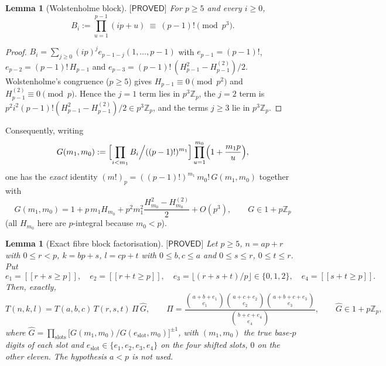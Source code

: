 \documentclass[11pt,reqno]{amsart}
\theoremstyle{plain}
\newtheorem{lemma}[theorem]{Lemma}
\theoremstyle{definition}
\theoremstyle{remark}
\numberwithin{equation}{section}
\newcommand{\ZZ}{\mathbb{Z}}
\newcommand{\Zp}{\ZZ_p}
\newcommand{\ii}[1]{[\![#1]\!]}
\newcommand{\PROVED}{\textsf{[PROVED]}}
\begin{document}
\begin{lemma}[Wolstenholme block]\label{lem:W}
$\PROVED$ For $p\ge5$ and every $i\ge0$,
\[
B_i:=\prod_{u=1}^{p-1}(ip+u)\ \equiv\ (p-1)!\pmod{p^3}.
\]
\end{lemma}

\begin{proof}
$B_i=\sum_{j\ge0}(ip)^je_{p-1-j}(1,\dots,p-1)$ with $e_{p-1}=(p-1)!$,
$e_{p-2}=(p-1)!\,H_{p-1}$ and $e_{p-3}=(p-1)!\,(H_{p-1}^2-H^{(2)}_{p-1})/2$. Wolstenholme's
congruence ($p\ge5$) gives $H_{p-1}\equiv0\pmod{p^2}$ and $H^{(2)}_{p-1}\equiv0\pmod p$. Hence
the $j=1$ term lies in $p^3\Zp$, the $j=2$ term is
$p^2i^2(p-1)!(H_{p-1}^2-H^{(2)}_{p-1})/2\in p^3\Zp$, and the terms $j\ge3$ lie in $p^3\Zp$.
\end{proof}

Consequently, writing
\begin{equation}\label{eq:G}
G(m_1,m_0):=\Bigl[\prod_{i<m_1}B_i\Big/((p-1)!)^{m_1}\Bigr]\prod_{u=1}^{m_0}\Bigl(1+\frac{m_1p}{u}\Bigr),
\end{equation}
one has the \emph{exact} identity $(m!)_p=((p-1)!)^{m_1}\,m_0!\,G(m_1,m_0)$ together with
\[
G(m_1,m_0)=1+p\,m_1H_{m_0}+p^2m_1^2\frac{H_{m_0}^2-H^{(2)}_{m_0}}{2}+O(p^3),
\qquad G\in1+p\Zp
\]
(all $H_{m_0}$ here are $p$-integral because $m_0<p$).

\begin{lemma}[Exact fibre block factorisation]\label{lem:B}
$\PROVED$ Let $p\ge5$, $n=ap+r$ with $0\le r<p$, $k=bp+s$, $l=cp+t$ with $0\le b,c\le a$ and
$0\le s\le r$, $0\le t\le r$. Put
\[
e_1=\ii{r+s\ge p},\quad e_2=\ii{r+t\ge p},\quad e_3=\lfloor(r+s+t)/p\rfloor\in\{0,1,2\},\quad
e_4=\ii{s+t\ge p}.
\]
Then, \emph{exactly},
\begin{equation}\label{eq:LemB}
T(n,k,l)=T(a,b,c)\,T(r,s,t)\,\Pi\,\hat G,\qquad
\Pi=\frac{\binom{a+b+e_1}{e_1}\binom{a+c+e_2}{e_2}\binom{a+b+c+e_3}{e_3}}{\binom{b+c+e_4}{e_4}},
\qquad \hat G\in1+p\Zp,
\end{equation}
where $\hat G=\prod_{\mathrm{slots}}\bigl[G(m_1,m_0)/G(e_{\mathrm{slot}},m_0)\bigr]^{\pm1}$,
with $(m_1,m_0)$ the true base-$p$ digits of each slot and $e_{\mathrm{slot}}\in\{e_1,e_2,e_3,e_4\}$
on the four shifted slots, $0$ on the other eleven. The hypothesis $a<p$ is \emph{not} used.
\end{lemma}
\end{document}
